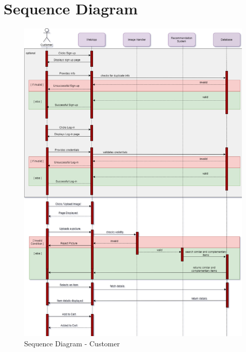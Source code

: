 \section{Sequence Diagram}
\begin{figure}[H]
\includegraphics[width=12cm]{images/SequenceDiag1.pdf} 
\centering
\caption{Sequence Diagram - Customer}
\label{sequence: one}
\end{figure}
